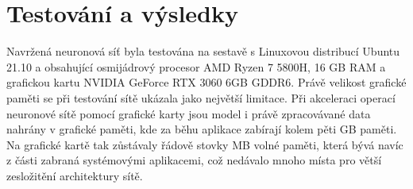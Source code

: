 \chapter{Testování a výsledky}
\label{sec:Testing}

Navržená neuronová síť byla testována na sestavě s Linuxovou distribucí Ubuntu 21.10 a obsahující osmijádrový procesor AMD Ryzen 7 5800H, 16 GB RAM a grafickou kartu NVIDIA GeForce RTX 3060 6GB GDDR6.
Právě velikost grafické paměti se při testování sítě ukázala jako největší limitace.
Při akceleraci operací neuronové sítě pomocí grafické karty jsou model i právě zpracovávané data nahrány v grafické paměti, kde za běhu aplikace zabírají kolem pěti GB paměti. 
Na grafické kartě tak zůstávaly řádově stovky MB volné paměti, která bývá navíc z části zabraná systémovými aplikacemi, což nedávalo mnoho místa pro větší zesložitění architektury sítě.







\endinput